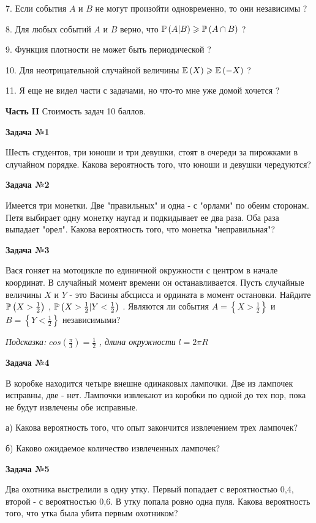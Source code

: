 \documentclass[pdftex,12pt,a4paper]{article}
\begin{document}
7. Если события  $A$  и  $B$  не могут произойти одновременно, то они независимы ?

8. Для любых событий  $A$  и  $B$  верно, что  $\P\left(A|B\right)\ge \P\left(A\cap B\right)$  ?

9. Функция плотности не может быть периодической ?

10. Для неотрицательной случайной величины  $\E\left(X\right)\ge \E\left(-X\right)$  ?

11. Я еще не видел части с задачами, но что-то мне уже домой хочется ?





\pagebreak 

{\bf Часть }{\bf II} Стоимость задач 10 баллов.

{\bf Задача №1}

Шесть студентов, три юноши и три девушки, стоят в очереди за пирожками в случайном порядке. Какова вероятность того, что юноши и девушки чередуются?

{\bf Задача №2}

Имеется три монетки. Две "правильных" и одна - с "орлами" по обеим сторонам. Петя выбирает одну монетку наугад и подкидывает ее два раза. Оба раза выпадает "орел". Какова вероятность того, что монетка "неправильная"?

{\bf Задача №3}

Вася гоняет на мотоцикле по единичной окружности с центром в начале координат. В случайный момент времени он останавливается. Пусть случайные величины  $X$  и  $Y$  - это Васины абсцисса и ордината в момент остановки. Найдите  $\P\left(X>\frac{1}{2} \right)$ ,  $\P\left(X>\frac{1}{2} |Y<\frac{1}{2} \right)$ . Являются ли события  $A=\left\{X>\frac{1}{2} \right\}$  и  $B=\left\{Y<\frac{1}{2} \right\}$  независимыми?

{\it Подсказка: } $cos\left(\frac{\pi }{3} \right)=\frac{1}{2} $ {\it , длина окружности } $l=2\pi R$ 

{\bf Задача №4}

В коробке находится четыре внешне одинаковых лампочки. Две из лампочек исправны, две - нет. Лампочки извлекают из коробки по одной до тех пор, пока не будут извлечены обе исправные.

а)	Какова вероятность того, что опыт закончится извлечением трех лампочек?

б)	Каково ожидаемое количество извлеченных лампочек?

{\bf Задача №5}

Два охотника выстрелили в одну утку. Первый попадает с вероятностью 0,4, второй - с вероятностью 0,6. В утку попала ровно одна пуля. Какова вероятность того, что утка была убита первым охотником?
\end{document}
